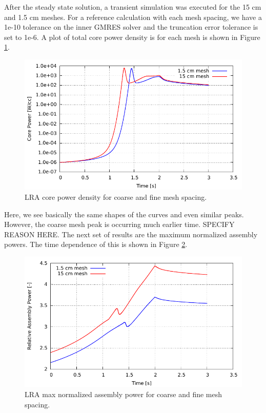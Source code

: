 \documentclass{ansconf}
\numberwithin{equation}{section}
\begin{document}
After the steady state solution, a transient simulation was executed for the 15 cm and 1.5 cm meshes. For a reference calculation with each mesh spacing, we have a 1e-10 tolerance on the inner GMRES solver and the truncation error tolerance is set to 1e-6. A plot of total core power density is for each mesh is shown in Figure \ref{fig:LRAcorepower}.
\begin{figure}
\centering \includegraphics[scale=1.00]{./figs/LRAcorepower.pdf}
\caption{LRA core power density for coarse and fine mesh spacing.}
\label{fig:LRAcorepower}
\end{figure}
Here, we see basically the same shapes of the curves and even similar peaks. However, the coarse mesh peak is occurring much earlier time. SPECIFY REASON HERE. The next set of results are the maximum normalized assembly powers. The time dependence of this is shown in Figure \ref{fig:LRAmaxpower}.
\begin{figure}
\centering \includegraphics[scale=1.00]{./figs/LRAassypowermax.pdf}
\caption{LRA max normalized assembly power for coarse and fine mesh spacing.}
\label{fig:LRAmaxpower}
\end{figure}
\end{document}
